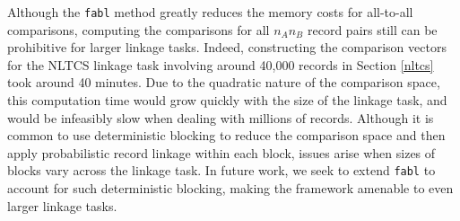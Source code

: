 \documentclass[ba]{imsart}
\begin{document}
	Although the \texttt{fabl} method greatly reduces the memory costs for all-to-all comparisons, computing the comparisons for all $n_A  n_B$ record pairs still can be prohibitive for larger linkage tasks. Indeed, constructing the comparison vectors for the NLTCS linkage task involving around 40,000 records in Section \ref{nltcs} took around 40 minutes. Due to the quadratic nature of the comparison space, this computation time would grow quickly with the size of the linkage task, and would be infeasibly slow when dealing with millions of records. Although it is common to use deterministic blocking to reduce the comparison space and then apply probabilistic record linkage within each block, issues arise when sizes of blocks vary across the linkage task. In future work, we seek to extend \texttt{fabl} to account for such deterministic blocking, making the framework amenable to even larger linkage tasks.
	
\begin{supplement}
\sdescription{}
\end{supplement}	

	
	\clearpage
	
	\bigskip
	
	
	
\end{document}
